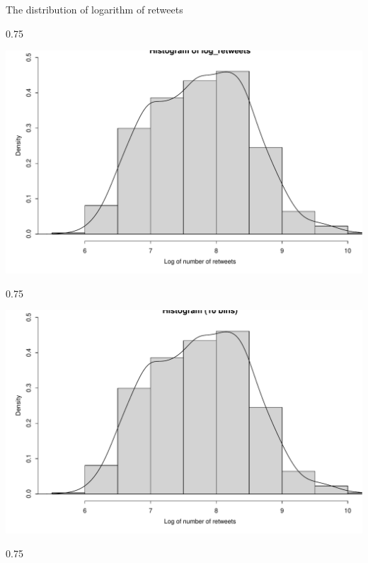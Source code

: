 \documentclass{beamer}\usepackage[]{graphicx}\usepackage[]{color}
\newenvironment{knitrout}{}{} %
\renewenvironment{knitrout}{\begin{spacing}{0.75}\begin{tiny}}{\end{tiny}\end{spacing}}
\begin{document}
\begin{frame}{The distribution of logarithm of retweets\;\;}
\begin{knitrout}\small
{}\color{fgcolor}

{\centering \includegraphics[width=0.89\linewidth]{figure/graphics-unnamed-chunk-8-1} 

}



\end{knitrout}

\begin{knitrout}\small
{}\color{fgcolor}

{\centering \includegraphics[width=0.89\linewidth]{figure/graphics-unnamed-chunk-9-1} 

}



\end{knitrout}

\begin{knitrout}\small
{}\color{fgcolor}


\end{knitrout}
\end{frame}
\end{document}

